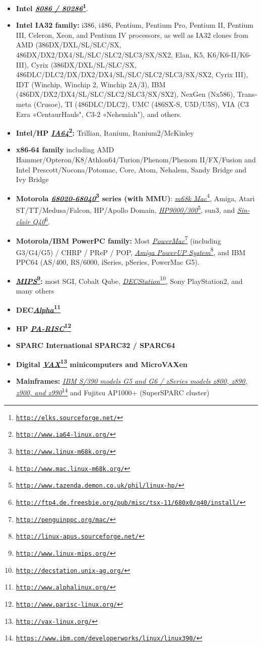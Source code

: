 \begin{latin}
\begin{itemize}
	\item {\bfseries Intel \emph{\url{8086 / 80286}}\footnote{\texttt{\url{http://elks.sourceforge.net/}}}}.
	\item {\bfseries Intel IA32 family:} i386, i486, Pentium, Pentium Pro,
		Pentium II, Pentium III, Celeron, Xeon, and Pentium IV processors,
		as well as IA32 clones from AMD (386DX/DXL/SL/SLC/SX,
		486DX/DX2/DX4/SL/SLC/SLC2/SLC3/SX/SX2, Elan, K5,
		K6/K6-II/K6-III), Cyrix (386DX/DXL/SL/SLC/SX,
		486DLC/DLC2/DX/DX2/DX4/SL/SLC/SLC2/SLC3/SX/SX2, Cyrix III),
		IDT (Winchip, Winchip 2, Winchip 2A/3),
		IBM (486DX/DX2/DX4/SL/SLC/SLC2/SLC3/SX/SX2),
		NexGen (Nx586), Transmeta (Crusoe),
		TI (486DLC/DLC2), UMC (486SX-S, U5D/U5S),
		VIA (C3 Ezra «CentaurHauls", C3-2 «Nehemiah"),
		and others.
	\item {\bfseries Intel/HP \emph{\url{IA64}}\footnote{\texttt{\url{http://www.ia64-linux.org/}}}:} Trillian, Itanium, Itanium2/McKinley
	\item {\bfseries x86-64 family} including AMD Hammer/Opteron/K8/Athlon64/Turion/Phenom/Phenom II/FX/Fusion and
		Intel Prescott/Nocona/Potomac, Core, Atom, Nehalem, Sandy Bridge and Ivy Bridge
	\item {\bfseries Motorola \emph{\url{68020-68040}}\footnote{\texttt{\url{http://www.linux-m68k.org/}}} series (with MMU)}:
		\emph{\url{m68k Mac}}\footnote{\texttt{\url{http://www.mac.linux-m68k.org/}}},
		Amiga, Atari ST/TT/Medusa/Falcon, HP/Apollo Domain,
		\emph{\url{HP9000/300}}\footnote{\texttt{\url{http://www.tazenda.demon.co.uk/phil/linux-hp/}}}, sun3, and
		\emph{\url{Sinclair Q40}}\footnote{\texttt{\url{http://ftp4.de.freesbie.org/pub/misc/tsx-11/680x0/q40/install/}}}.
	\item {\bfseries Motorola/IBM PowerPC family:} Most
		\emph{\url{PowerMac}}\footnote{\texttt{\url{http://penguinppc.org/mac/}}}
		 (including G3/G4/G5)  / CHRP / PReP / POP, \emph{\url{Amiga PowerUP System}}\footnote{\texttt{\url{http://linux-apus.sourceforge.net/}}}, and IBM PPC64 (AS/400, RS/6000, iSeries,	pSeries, PowerMac G5).
	\item {\bfseries \emph{\url{MIPS}}\footnote{\texttt{\url{http://www.linux-mips.org/}}}:} most SGI, Cobalt Qube,
		\emph{\url{DECStation}}\footnote{\texttt{\url{http://decstation.unix-ag.org/}}}, Sony PlayStation2, and many others
	\item {\bfseries DEC\emph{\url{Alpha}}\footnote{\texttt{\url{http://www.alphalinux.org/}}}}
	\item {\bfseries HP \emph{\url{PA-RISC}}\footnote{\texttt{\url{http://www.parisc-linux.org/}}}}
	\item {\bfseries SPARC International SPARC32 / SPARC64}
	\item {\bfseries Digital \emph{\url{VAX}}\footnote{\texttt{\url{http://vax-linux.org/}}} minicomputers and MicroVAXen}
	\item {\bfseries Mainframes:} 
	\emph{\url{IBM S/390 models G5 and G6 / zSeries models z800, z890, z900, and z990}}\footnote{\texttt{\url{https://www.ibm.com/developerworks/linux/linux390/}}}
		 and Fujitsu AP1000+ (SuperSPARC cluster)
\end{itemize}
\end{latin}

